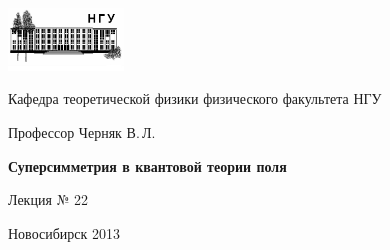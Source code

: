 \documentclass[12pt,pagesize,paper=landscape,paper=192mm:108mm]{scrbook}
\begin{document}
\begin{titlepage}
  \vspace*{-1em}
  \begin{center}
    \includegraphics[width=0.23\textwidth]{../NSU-logo}

    Кафедра теоретической физики физического факультета НГУ
    \medskip

    \Large
    Профессор Черняк В.\,Л.
    \medskip

    \huge
    \textbf{Суперсимметрия в квантовой теории поля}
    \bigskip

    \Large
    Лекция № 22
    \vfill

    \vfill

    \normalsize \ccbysa\hspace{0.5em}  Новосибирск 2013
  \end{center}
\end{titlepage}
\end{document}
